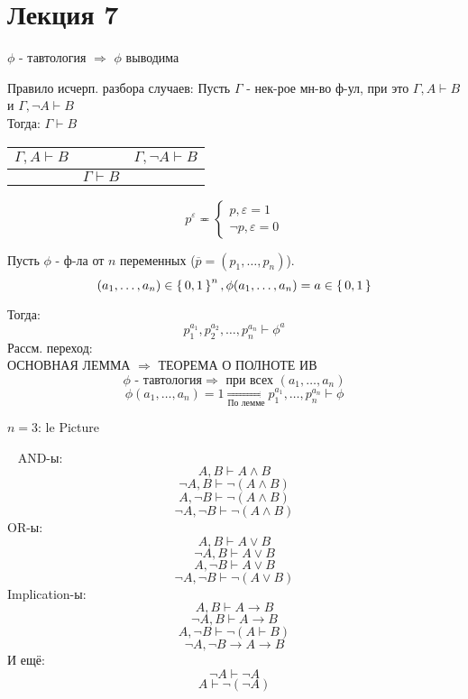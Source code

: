 \section{Лекция 7}
\begin{theorem}[О полноте ИВ]
$\phi$ - тавтология $\Rightarrow$ $\phi$ выводима
\end{theorem}
Правило исчерп. разбора случаев:
Пусть $\Gamma$ - нек-рое мн-во ф-ул, при это $\Gamma, A \vdash B$ и $\Gamma, \neg A \vdash B$ \\
Тогда: $\Gamma \vdash B$ \\
\begin{center}
\begin{tabular}{ c c c } 
  $\Gamma, A \vdash B$ & & $\Gamma, \neg A \vdash B$ \\
 \hline
                       & $\Gamma \vdash B$ & \\
\end{tabular}
\end{center}
\begin{symb}
\[
p ^{\varepsilon} \eqcirc \begin{cases}
p, \varepsilon = 1 \\
\neg p, \varepsilon = 0
\end{cases}
\]
\end{symb}
\begin{lemma}[Основная]
Пусть $\phi$ - ф-ла от $n$ переменных ($\overline{p} = (p_1, \ldots, p_n)$).
\[
  (a_1, \ldots, a_n) \in \set{0, 1}^{n}, \phi(a_1, \ldots, a_n) = a \in \set{0, 1}
\]
\end{lemma}
Тогда:
\[
p_1^{a_1}, p_2^{a_2}, \ldots, p_n^{a_n} \vdash \phi^{a}
\]
Рассм. переход: \\
ОСНОВНАЯ ЛЕММА $\Rightarrow$ ТЕОРЕМА О ПОЛНОТЕ ИВ \\
\[
\phi \text{ - тавтология} \Rightarrow \text{ при всех } (a_1, \ldots, a_n)
\]
\[
\phi(a_1, \ldots, a_n) = 1 \underset{\text{По лемме}}{\Longrightarrow} p_1^{a_1}, \ldots, p_n^{a_n} \vdash \phi
\]
\begin{example}
$n = 3$:
le Picture
\end{example}
\begin{lemma}[Базовая]
  ~\newline
  AND-ы:
\[
A, B \vdash A \land B
\]
\[
\neg A, B \vdash \neg(A \land B)
\]
\[
A, \neg B \vdash \neg(A \land B)
\]
\[
\neg A, \neg B \vdash \neg(A \land B)
\]
  OR-ы:
  \[
  A, B \vdash A \lor B
  \]
  \[
  \neg A, B \vdash A \lor B
  \]
  \[
  A, \neg B \vdash A \lor B
  \]
  \[
  \neg A, \neg B \vdash \neg(A \lor B)
  \]
  Implication-ы:
  \[
  A, B \vdash A \rightarrow B
  \]
  \[
  \neg A, B \vdash A \rightarrow B
  \]
  \[
  A, \neg B \vdash \neg (A \vdash B)
  \]
  \[
  \neg A, \neg B \rightarrow A \rightarrow B
  \]
  И ещё: 
  \[
  \neg A \vdash \neg A
  \]
  \[
  A \vdash \neg(\neg A)
  \]
\end{lemma}

